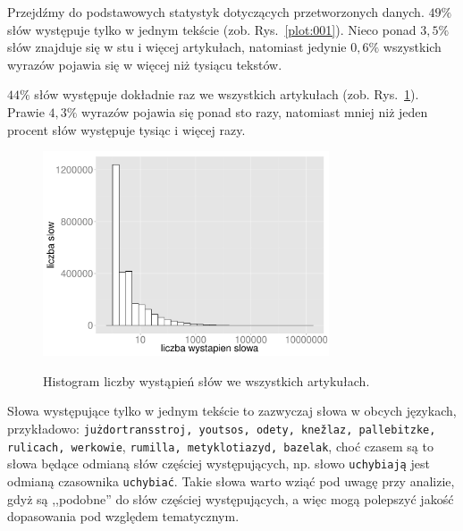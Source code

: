 \documentclass{praca1}
\begin{document}
Przejdźmy do podstawowych statystyk dotyczących przetworzonych danych. $49\%$ słów występuje tylko w jednym tekście (zob. Rys.~\ref{plot:001}). Nieco ponad $3,5\%$ słów znajduje się w stu i więcej artykułach, natomiast jedynie $0,6\%$ wszystkich wyrazów pojawia się w więcej niż tysiącu tekstów.

$44\%$ słów występuje dokładnie raz we wszystkich artykułach (zob. Rys.~\ref{plot:002}). Prawie $4,3\%$ wyrazów pojawia się ponad sto razy, natomiast mniej niż jeden procent słów występuje tysiąc i więcej razy.


\begin{figure}[!h]
  \centering
  \includegraphics[width=240pt]{plot2.pdf}\\
  \caption{Histogram liczby wystąpień słów we wszystkich artykułach.}\label{plot:002}
\end{figure}


Słowa występujące tylko w jednym tekście to zazwyczaj słowa w obcych językach, przykładowo: \verb|jużdortransstroj, youtsos, odety, knežlaz, pallebitzke, rulicach, werkowie|, \verb|rumilla, metyklotiazyd, bazelak|,
choć czasem są to słowa będące odmianą słów częściej występujących, np. słowo \verb|uchybiają| jest odmianą czasownika \verb|uchybiać|. Takie słowa warto wziąć pod uwagę przy analizie, gdyż są ,,podobne'' do słów częściej występujących, a więc mogą polepszyć jakość dopasowania pod względem tematycznym.
\end{document}
